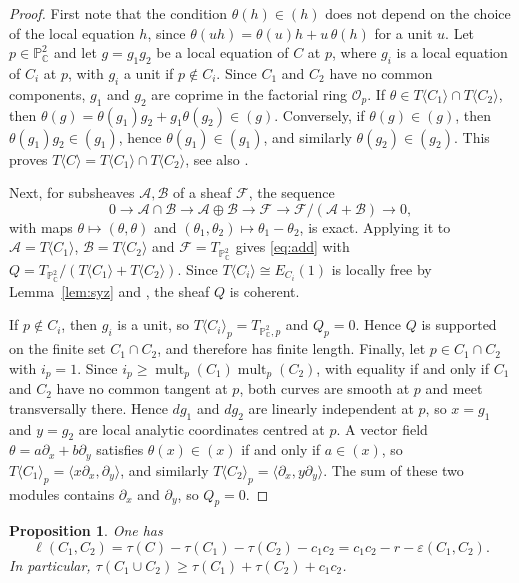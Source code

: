 \documentclass[11pt]{amsart}
\newtheorem{proposition}[theorem]{Proposition}
\theoremstyle{definition}
\numberwithin{equation}{section}
\newcommand{\PP}{\mathbb{P}}
\newcommand{\CC}{\mathbb{C}}
\newcommand{\cO}{\mathcal{O}}
\DeclareMathOperator{\mult}{mult}
\begin{document}
\begin{proof}
First note that the condition $\theta(h)\in(h)$ does not depend on the choice of
the local equation $h$, since $\theta(uh)=\theta(u)h+u\,\theta(h)$ for a unit $u$.
Let $p\in\PP^2_\CC$ and let $g=g_1g_2$ be a local equation of $C$ at $p$, where $g_i$
is a local equation of $C_i$ at $p$, with $g_i$ a unit if $p\notin C_i$.
Since $C_1$ and $C_2$ have no common components, $g_1$ and $g_2$ are coprime
in the factorial ring $\cO_p$.
If $\theta\in T\langle C_1\rangle\cap T\langle C_2\rangle$, then
$\theta(g)=\theta(g_1)g_2+g_1\theta(g_2)\in(g)$.
Conversely, if $\theta(g)\in(g)$, then $\theta(g_1)g_2\in(g_1)$, hence
$\theta(g_1)\in(g_1)$, and similarly $\theta(g_2)\in(g_2)$.
This proves $T\langle C\rangle=T\langle C_1\rangle\cap T\langle C_2\rangle$,
see also \cite[Section~1.4]{ST}.

Next, for subsheaves $\mathcal{A},\mathcal{B}$ of a sheaf $\mathcal{F}$, the sequence
\[
0\to\mathcal{A}\cap\mathcal{B}\to\mathcal{A}\oplus\mathcal{B}\to\mathcal{F}
\to\mathcal{F}/(\mathcal{A}+\mathcal{B})\to0,
\]
with maps $\theta\mapsto(\theta,\theta)$ and $(\theta_1,\theta_2)\mapsto\theta_1-\theta_2$,
is exact. Applying it to $\mathcal{A}=T\langle C_1\rangle$, $\mathcal{B}=T\langle C_2\rangle$
and $\mathcal{F}=T_{\PP^2_\CC}$ gives \eqref{eq:add} with
$Q=T_{\PP^2_\CC}/(T\langle C_1\rangle+T\langle C_2\rangle)$.
Since $T\langle C_i\rangle\cong E_{C_i}(1)$ is locally free by Lemma~\ref{lem:syz}
and \cite{DS}, the sheaf $Q$ is coherent.

If $p\notin C_i$, then $g_i$ is a unit, so $T\langle C_i\rangle_p=T_{\PP^2_\CC,p}$ and $Q_p=0$.
Hence $Q$ is supported on the finite set $C_1\cap C_2$, and therefore has finite length.
Finally, let $p\in C_1\cap C_2$ with $i_p=1$.
Since $i_p\ge\mult_p(C_1)\mult_p(C_2)$, with equality if and only if $C_1$ and $C_2$
have no common tangent at $p$, both curves are smooth at $p$ and meet transversally there.
Hence $dg_1$ and $dg_2$ are linearly independent at $p$, so $x=g_1$ and $y=g_2$
are local analytic coordinates centred at $p$.
A vector field $\theta=a\partial_x+b\partial_y$ satisfies $\theta(x)\in(x)$ if and only if
$a\in(x)$, so $T\langle C_1\rangle_p=\langle x\partial_x,\partial_y\rangle$, and similarly
$T\langle C_2\rangle_p=\langle\partial_x,y\partial_y\rangle$.
The sum of these two modules contains $\partial_x$ and $\partial_y$, so $Q_p=0$.
\end{proof}

\begin{proposition}\label{prop:add}
One has
\[
\ell(C_1,C_2)=\tau(C)-\tau(C_1)-\tau(C_2)-c_1c_2=c_1c_2-r-\varepsilon(C_1,C_2).
\]
In particular, $\tau(C_1\cup C_2)\ge\tau(C_1)+\tau(C_2)+c_1c_2$.
\end{proposition}
\end{document}
